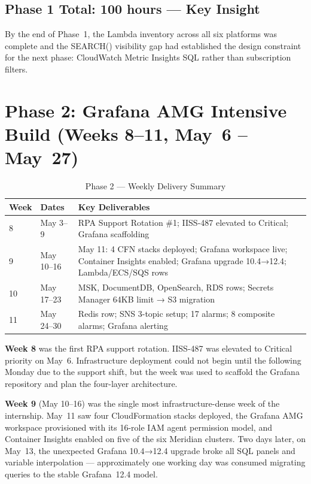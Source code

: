 \subsection{Phase 1 Total: 100 hours --- Key Insight}

By the end of Phase~1, the Lambda inventory across all six platforms was complete
and the SEARCH() visibility gap had established the design constraint for the
next phase: CloudWatch Metric Insights SQL rather than subscription filters.

\section{Phase 2: Grafana AMG Intensive Build (Weeks 8--11, May~6 -- May~27)}
\label{sec:wb_phase2}

\begin{table}[ht]
\centering
\caption{Phase 2 --- Weekly Delivery Summary}
\label{tab:wb_phase2}
\begin{tabular}{p{1.2cm}p{4.0cm}p{7.5cm}}
\toprule
\textbf{Week} & \textbf{Dates} & \textbf{Key Deliverables} \\
\midrule
8 & May 3--9 & RPA Support Rotation \#1; IISS-487 elevated to Critical; Grafana scaffolding \\
9 & May 10--16 & May 11: 4 CFN stacks deployed; Grafana workspace live; Container Insights enabled; Grafana upgrade 10.4→12.4; Lambda/ECS/SQS rows \\
10 & May 17--23 & MSK, DocumentDB, OpenSearch, RDS rows; Secrets Manager 64KB limit → S3 migration \\
11 & May 24--30 & Redis row; SNS 3-topic setup; 17 alarms; 8 composite alarms; Grafana alerting \\
\bottomrule
\end{tabular}
\end{table}

\textbf{Week 8} was the first RPA support rotation. IISS-487 was elevated
to Critical priority on May~6. Infrastructure deployment could not begin
until the following Monday due to the support shift, but the week was used
to scaffold the Grafana repository and plan the four-layer architecture.

\textbf{Week 9} (May 10--16) was the single most infrastructure-dense week
of the internship. May~11 saw four CloudFormation stacks deployed, the Grafana
AMG workspace provisioned with its 16-role IAM agent permission model, and
Container Insights enabled on five of the six Meridian clusters. Two days
later, on May~13, the unexpected Grafana 10.4→12.4 upgrade broke all SQL
panels and variable interpolation --- approximately one working day was
consumed migrating queries to the stable Grafana~12.4 model.

